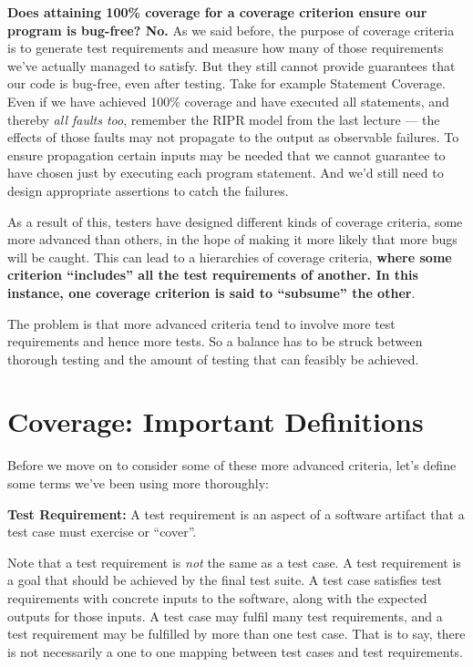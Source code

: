 
{\bf Does attaining 100\% coverage for a coverage criterion ensure our program
is bug-free? No.} As we said before, the purpose of coverage criteria is to
generate test requirements and measure how many of those requirements we've
actually managed to satisfy. But they still cannot provide guarantees that our
code is bug-free, even after testing. Take for example Statement Coverage. Even
if we have achieved 100\% coverage and have executed all statements, and thereby
{\it all faults too}, remember the RIPR model from the last lecture --- the
effects of those faults may not propagate to the output as observable failures.
To ensure propagation certain inputs may be needed that we cannot guarantee to
have chosen just by executing each program statement. And we'd still need to
design appropriate assertions to catch the failures.

As a result of this, testers have designed different kinds of coverage criteria,
some more advanced than others, in the hope of making it more likely that more
bugs will be caught. This can lead to a hierarchies of coverage criteria, {\bf
where some criterion ``includes'' all the test requirements of another. In this
instance, one coverage criterion is said to ``subsume'' the other}. 

The problem is that more advanced criteria tend to involve more test
requirements and hence more tests. So a balance has to be struck between
thorough testing and the amount of testing that can feasibly be achieved. 


\section{Coverage: Important Definitions}

Before we move on to consider some of these more advanced criteria, let's define
some terms we've been using more thoroughly:

{\bf Test Requirement:} A test requirement is an aspect of a software artifact
that a test case must exercise or ``cover''. 

Note that a test requirement is {\it not} the same as a test case. A test
requirement is a goal that should be achieved by the final test suite. A test
case satisfies test requirements with concrete inputs to the software, along
with the expected outputs for those inputs. A test case may fulfil many test
requirements, and a test requirement may be fulfilled by more than one test
case. That is to say, there is not necessarily a one to one mapping between test
cases and test requirements.

